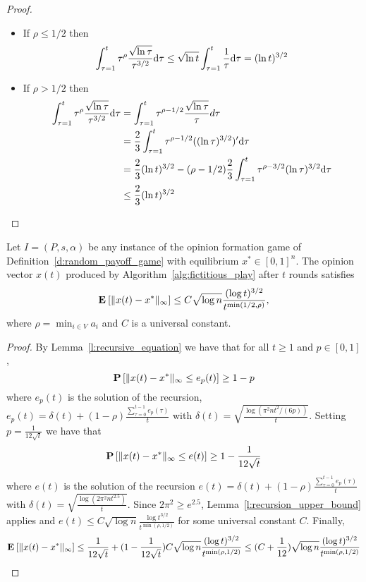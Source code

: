 \begin{proof}
  \begin{itemize}
    \item If
      $\rho\leq 1/2$ then
      \[
        \int_{\tau=1}^t \tau^\rho\frac{\sqrt{\ln \tau}}{\tau^{3/2}}\mathrm{d}\tau
        \leq
        \sqrt{\ln t }
        \int_{\tau=1}^t
        \frac{1}{\tau}\mathrm{d}\tau = (\ln t)^{3/2}
      \]
    \item If $\rho > 1/2$ then\\
      \begin{align*}
        \int_{\tau=1}^t
        \tau^\rho\frac{\sqrt{\ln \tau}}{\tau^{3/2}}\mathrm{d}\tau
        &=
        \int_{\tau=1}^t \tau^{\rho-1/2}\frac{\sqrt{\ln \tau}}{\tau}d\tau \\
        &=
        \frac{2}{3} \int_{\tau=1}^t
        \tau^{\rho-1/2}((\ln \tau)^{3/2})'\mathrm{d}\tau \\
        &=
        \frac{2}{3}(\ln t)^{3/2} - (\rho-1/2)\frac{2}{3}
        \int_{\tau=1}^t \tau^{\rho-3/2}(\ln \tau)^{3/2}\mathrm{d}\tau \\
        &\leq \frac{2}{3} (\ln t)^{3/2}
      \end{align*}
  \end{itemize}
\end{proof}

\begin{theorem}\label{thm:convergence}
  Let $I = (P,s, \alpha)$ be any instance of the opinion formation
  game of Definition~\ref{d:random_payoff_game} with equilibrium
  $x^* \in [0,1]^n$.  The opinion vector $x(t)$ produced by
  Algorithm~\ref{alg:fictitious_play} after $t$ rounds satisfies
  \[
    \bm{\mathrm{E}}_{} \left[ \| x(t) - x^* \|_{\infty} \right] \leq
    C \sqrt{\log n}\frac{(\log t)^{3/2}}{t^{\min(1/2,\rho)}},
  \]
  where $\rho = \min_{i \in V} a_i$ and $C$ is a universal constant.
\end{theorem}

\begin{proof}
By Lemma~\ref{l:recursive_equation} we have that for all $t\geq 1$ and $p \in [0,1]$,
\[\bm{\mathrm{P}}\left[\| x(t)-x^* \|_{\infty} \leq e_p(t)\right] \geq 1-p\]
where $e_p(t)$ is the solution of the recursion, $e_p(t) =\delta(t) + (1-\rho)\frac{\sum_{\tau=0}^{t-1}e_p(\tau)}{t}$ with 
$\delta(t)=\sqrt{ \frac{\log(\pi^2 n t^2/(6 p))}{t}}$. Setting $p=\frac{1}{12\sqrt{t}}$ we have that  
\[\bm{\mathrm{P}}\left[\| x(t)-x^* \|_{\infty} \leq e(t)\right] \geq 1-\frac{1}{12\sqrt{t}}\]
where $e(t)$ is the solution of the recursion $e(t) =\delta(t) + (1-\rho)\frac{\sum_{\tau=0}^{t-1}e_p(\tau)}{t}$ with 
$\delta(t)=\sqrt{\frac{\log(2\pi^2 n t^{2.5})}{t}}$. Since $2\pi^2 \geq e^{2.5}$, Lemma~\ref{l:recursion_upper_bound} applies and 
$e(t)\leq C\sqrt{\log n}\frac{\log t^{3/2}}{t^{\min(\rho,1/2)}}$ for some universal constant $C$. Finally,
\[\bm{\mathrm{E}}_{} \left[ \| x(t) - x^* \|_{\infty} \right] \leq \frac{1}{12\sqrt{t}} + (1-\frac{1}{12\sqrt{t}})C\sqrt{\log n}\frac{(\log t)^{3/2}}{t^{\min(\rho,1/2)}}
\leq (C+\frac{1}{12})\sqrt{\log n}\frac{(\log t)^{3/2}}{t^{\min(\rho,1/2)}}\]
\end{proof}
